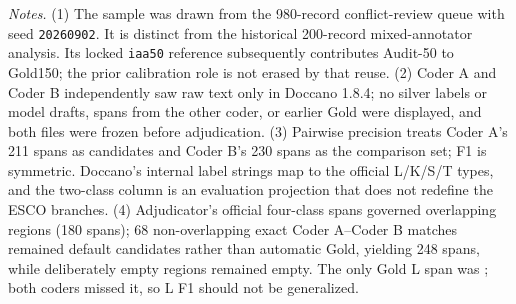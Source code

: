 \begin{table}[!h]
\vspace{2pt}
\begin{minipage}{\textwidth}
\footnotesize
\textit{Notes.}
(1) The sample was drawn from the 980-record conflict-review queue with seed \texttt{20260902}. It is distinct from the historical 200-record mixed-annotator analysis. Its locked \texttt{iaa50} reference subsequently contributes Audit-50 to Gold150; the prior calibration role is not erased by that reuse.
(2) Coder A and Coder B independently saw raw text only in Doccano 1.8.4; no silver labels or model drafts, spans from the other coder, or earlier Gold were displayed, and both files were frozen before adjudication.
(3) Pairwise precision treats Coder A's 211 spans as candidates and Coder B's 230 spans as the comparison set; F1 is symmetric. Doccano's internal label strings map to the official L/K/S/T types, and the two-class column is an evaluation projection that does not redefine the ESCO branches.
(4) Adjudicator's official four-class spans governed overlapping regions (180 spans); 68 non-overlapping exact Coder A--Coder B matches remained default candidates rather than automatic Gold, yielding 248 spans, while deliberately empty regions remained empty. The only Gold L span was ; both coders missed it, so L F1 should not be generalized.
\end{minipage}
\end{table}
